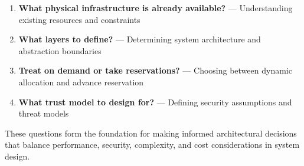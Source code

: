 \documentclass[../../compsys.tex]{subfiles}
\begin{document}
\begin{enumerate}
  \item \textbf{What physical infrastructure is already available?} — Understanding existing resources and constraints
  \item \textbf{What layers to define?} — Determining system architecture and abstraction boundaries
  \item \textbf{Treat on demand or take reservations?} — Choosing between dynamic allocation and advance reservation
  \item \textbf{What trust model to design for?} — Defining security assumptions and threat models
\end{enumerate}

These questions form the foundation for making informed architectural decisions that balance performance, security, complexity, and cost considerations in system design.
\end{document}
